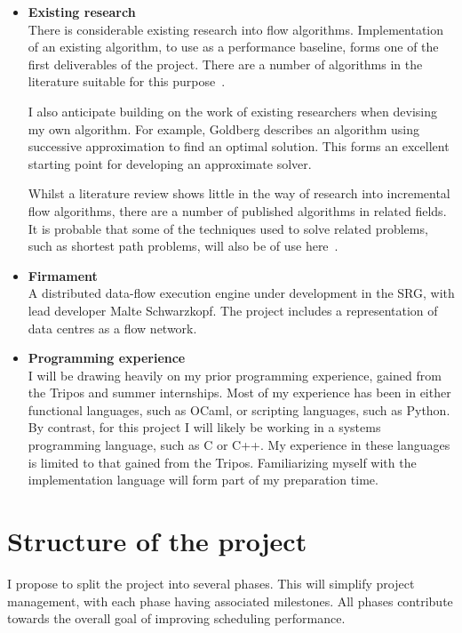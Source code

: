 \begin{itemize}
  \item \textbf{Existing research} \\
    There is considerable existing research into flow algorithms. Implementation of an existing algorithm, to use as a performance baseline, forms one of the first deliverables of the project. There are a number of algorithms in the literature suitable for this purpose~\cite{Goldberg:1997,KiralyKovacs:2012}.
    
    I also anticipate building on the work of existing researchers when devising my own algorithm. For example, Goldberg\cite{Goldberg:1987} describes an algorithm using successive approximation to find an optimal solution. This forms an excellent starting point for developing an approximate solver.

    Whilst a literature review shows little in the way of research into incremental flow algorithms, there are a number of published algorithms in related fields. It is probable that some of the techniques used to solve related problems, such as shortest path problems, will also be of use here~\cite{Ramalingam:1996,Roddity:2011}.
  \item \textbf{Firmament} \\
    A distributed data-flow execution engine under development in the SRG, with lead developer Malte Schwarzkopf. The project includes a representation of data centres as a flow network.
  \item \textbf{Programming experience} \\ 
    I will be drawing heavily on my prior programming experience, gained from the Tripos and summer internships. Most of my experience has been in either functional languages, such as OCaml, or scripting languages, such as Python. By contrast, for this project I will likely be working in a systems programming language, such as C or C++. My experience in these languages is limited to that gained from the Tripos. Familiarizing myself with the implementation language will form part of my preparation time.
\end{itemize}

\section*{Structure of the project}

I propose to split the project into several phases. This will simplify project management, with each phase having associated milestones. All phases contribute towards the overall goal of improving scheduling performance.


